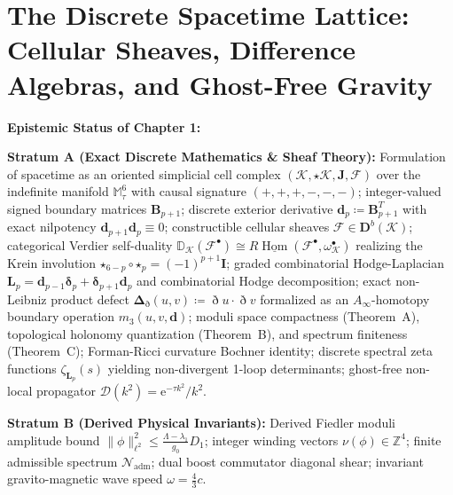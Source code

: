 \documentclass[
    12pt,
    a4paper,
    headings=normal,
    twoside=false,
    open=any,
    parskip=half
]{scrbook}
\DeclareMathOperator{\Hom}{Hom}
\newcommand{\ethop}{\eth}
\newcommand{\eu}{\mathrm{e}}
\newcommand{\spectrumN}{\mathcal{N}_{\text{adm}}}
\begin{document}
\vspace{0.8cm}

\clearpage
\tableofcontents
\clearpage
\mainmatter

\chapter{The Discrete Spacetime Lattice: Cellular Sheaves, Difference Algebras, and Ghost-Free Gravity}
\label{chap:ch1_expanded}

\begin{firewallbox}
\textbf{Epistemic Status of Chapter 1:}\par\smallskip\noindent
\textbf{Stratum A (Exact Discrete Mathematics \& Sheaf Theory):} Formulation of spacetime as an oriented simplicial cell complex $(\mathcal{K}, \star\mathcal{K}, \mathbf{J}, \mathscr{F})$ over the indefinite manifold $\mathbb{M}_\tau^6$ with causal signature $(+,+,+,-,-,-)$; integer-valued signed boundary matrices $\mathbf{B}_{p+1}$; discrete exterior derivative $\mathbf{d}_p \coloneqq \mathbf{B}_{p+1}^T$ with exact nilpotency $\mathbf{d}_{p+1}\mathbf{d}_p \equiv 0$; constructible cellular sheaves $\mathscr{F} \in \mathbf{D}^b(\mathcal{K})$; categorical Verdier self-duality $\mathbb{D}_\mathcal{K}(\mathscr{F}^\bullet) \cong R\underline{\Hom}(\mathscr{F}^\bullet, \omega_\mathcal{K}^\bullet)$ realizing the Krein involution $\boldsymbol{\star}_{6-p} \circ \boldsymbol{\star}_p = (-1)^{p+1}\mathbf{I}$; graded combinatorial Hodge-Laplacian $\mathbf{L}_p = \mathbf{d}_{p-1}\boldsymbol{\delta}_p + \boldsymbol{\delta}_{p+1}\mathbf{d}_p$ and combinatorial Hodge decomposition; exact non-Leibniz product defect $\mathbf{\Delta}_\ethop(u,v) \coloneqq \ethop u \cdot \ethop v$ formalized as an $A_\infty$-homotopy boundary operation $m_3(u,v,\mathbf{d})$; moduli space compactness (Theorem~A), topological holonomy quantization (Theorem~B), and spectrum finiteness (Theorem~C); Forman-Ricci curvature Bochner identity; discrete spectral zeta functions $\zeta_{\mathbf{L}_p}(s)$ yielding non-divergent 1-loop determinants; ghost-free non-local propagator $\mathcal{D}(k^2) = \eu^{-\tau k^2}/k^2$.\par\smallskip\noindent
\textbf{Stratum B (Derived Physical Invariants):} Derived Fiedler moduli amplitude bound $\|\phi\|_{\ell^2}^2 \le \frac{\Lambda - \lambda_1}{g_0} D_1$; integer winding vectors $\nu(\phi) \in \mathbb{Z}^4$; finite admissible spectrum $\spectrumN$; dual boost commutator diagonal shear; invariant gravito-magnetic wave speed $\omega = \frac{4}{3}c$.\par\smallskip\noindent

\end{firewallbox}
\end{document}
